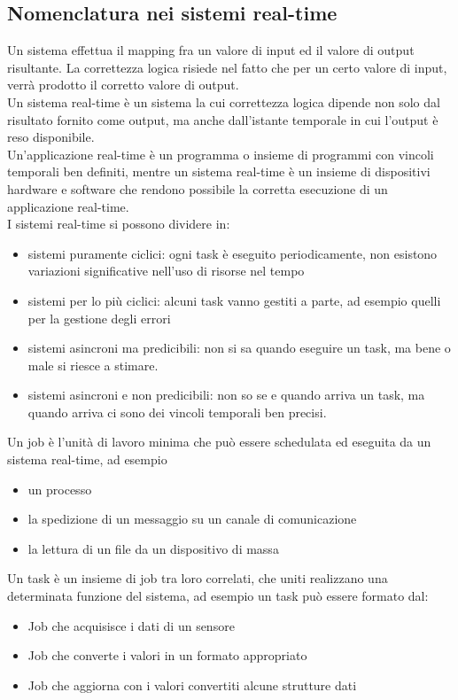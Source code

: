 \documentclass{article}
\begin{document}
\subsection{Nomenclatura nei sistemi real-time}
Un sistema effettua il mapping fra un valore di input ed il valore di output risultante. La correttezza logica risiede nel fatto che per un certo valore di input, verrà prodotto il corretto valore di output.\\ Un sistema real-time è un sistema la cui correttezza logica dipende non solo dal risultato fornito come output, ma anche dall'istante temporale in cui l'output è reso disponibile.\\ Un'applicazione real-time è un programma o insieme di programmi con vincoli temporali ben definiti, mentre un sistema real-time è un insieme di dispositivi hardware e software che rendono possibile la corretta esecuzione di un applicazione real-time.\\ I sistemi real-time si possono dividere in:
\begin{itemize}
\item sistemi puramente ciclici: ogni task è eseguito periodicamente, non esistono variazioni significative nell'uso di risorse nel tempo
\item sistemi per lo più ciclici: alcuni task vanno gestiti a parte, ad esempio quelli per la gestione degli errori
\item sistemi asincroni ma predicibili: non si sa quando eseguire un task, ma bene o male si riesce a stimare.
\item sistemi asincroni e non predicibili: non so se e quando arriva un task, ma quando arriva ci sono dei vincoli temporali ben precisi.
\end{itemize}
Un job è l'unità di lavoro minima che può essere schedulata ed eseguita da un sistema real-time, ad esempio 
\begin{itemize}
\item un processo
\item la spedizione di un messaggio su un canale di comunicazione
\item la lettura di un file da un dispositivo di massa 
\end{itemize}
Un task è un insieme di job tra loro correlati, che uniti realizzano una determinata funzione del sistema, ad esempio un task può essere formato dal:
\begin{itemize}
\item Job che acquisisce i dati di un sensore
\item Job che converte i valori in un formato appropriato
\item Job che aggiorna con i valori convertiti alcune strutture dati
\end{itemize}
\end{document}
